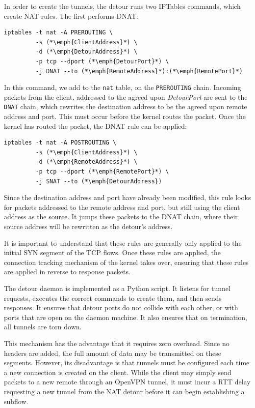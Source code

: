 \documentclass{cwru}
\begin{document}
In order to create the tunnels, the detour runs two IPTables commands, which
create NAT rules. The first performs DNAT:

\begin{lstlisting}
iptables -t nat -A PREROUTING \
         -s (*\emph{ClientAddress}*) \
         -d (*\emph{DetourAddress}*) \
         -p tcp --dport (*\emph{DetourPort}*) \
         -j DNAT --to (*\emph{RemoteAddress}*):(*\emph{RemotePort}*)
\end{lstlisting}

In this command, we add to the \texttt{nat} table, on the \texttt{PREROUTING}
chain. Incoming packets from the client, addressed to the agreed upon
\textit{DetourPort} are sent to the \texttt{DNAT} chain, which rewrites the
destination address to be the agreed upon remote address and port. This must
occur before the kernel routes the packet. Once the kernel has routed the
packet, the DNAT rule can be applied:

\begin{lstlisting}
iptables -t nat -A POSTROUTING \
         -s (*\emph{ClientAddress}*) \
         -d (*\emph{RemoteAddress}*) \
         -p tcp --dport (*\emph{RemotePort}*) \
         -j SNAT --to (*\emph{DetourAddress})
\end{lstlisting}

Since the destination address and port have already been modified, this rule
looks for packets addressed to the remote address and port, but still using the
client address as the source. It jumps these packets to the DNAT chain, where
their source address will be rewritten as the detour's address.

It is important to understand that these rules are generally only applied to the
initial SYN segment of the TCP flows. Once these rules are applied, the
connection tracking mechanism of the kernel takes over, ensuring that these
rules are applied in reverse to response packets.

The detour daemon is implemented as a Python script. It listens for tunnel
requests, executes the correct commands to create them, and then sends
responses. It ensures that detour ports do not collide with each other, or with
ports that are open on the daemon machine. It also ensures that on termination,
all tunnels are torn down.

This mechanism has the advantage that it requires zero overhead. Since no
headers are added, the full amount of data may be transmitted on these segments.
However, its disadvantage is that tunnels must be configured each time a new
connection is created on the client. While the client may simply send packets to
a new remote through an OpenVPN tunnel, it must incur a RTT delay requesting a
new tunnel from the NAT detour before it can begin establishing a subflow.
\end{document}
